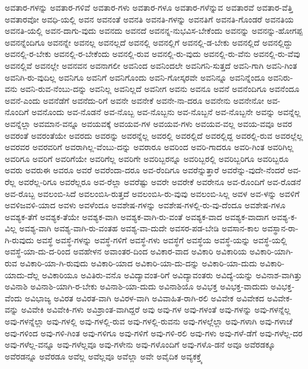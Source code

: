 {ಅವತಾರ-ಗಳನ್ನು
ಅವತಾರ-ಗಳಿವೆ
ಅವತಾರ-ಗಳು
ಅವತಾರ-ಗಳೂ
ಅವತಾರ-ಗಳೆನ್ನುವ
ಅವತಾರವೆ
ಅವತಾರ-ವೆತ್ತಿ
ಅವತಾರವೋ
ಅವಧಿ-ಯಲ್ಲಿ
ಅವನ
ಅವನಂತೆ
ಅವನತಿ
ಅವನತಿ-ಗಳನ್ನು
ಅವನತಿಗೆ
ಅವನತಿ-ಗೊಂಡರೆ
ಅವನತಿಯ
ಅವನತಿ-ಯಲ್ಲಿ
ಅವನ-ದಾಗು-ವುದು
ಅವನದು
ಅವನದೆ
ಅವನನ್ನ-ನುಭವಿಸ-ಬೇಕೆಂದು
ಅವನನ್ನು
ಅವನನ್ನು-ಹೋಗಪ್ಪ
ಅವನನ್ನೆಂದಿಗೂ
ಅವನನ್ನೇ
ಅವನಲ್ಲ
ಅವನಲ್ಲದೆ
ಅವನಲ್ಲಿ
ಅವನಲ್ಲಿಗೆ
ಅವನಲ್ಲಿ-ಡ-ಬೇಕು
ಅವನಲ್ಲಿದೆ
ಅವನಲ್ಲಿದ್ದು
ಅವನಲ್ಲಿ-ರ-ಬೇಕು
ಅವನಲ್ಲಿ-ರ-ಬೇಕೆಂದು
ಅವನಲ್ಲಿ-ರುವ
ಅವನಲ್ಲಿ-ರು-ವುದು
ಅವನಲ್ಲಿ-ರು-ವೆನು
ಅವನಲ್ಲಿ-ರು-ವೆವು
ಅವನಲ್ಲಿವೆ
ಅವನಲ್ಲೇ
ಅವನವನ
ಅವನಾಗಲೀ
ಅವನಿಂದ
ಅವನಿಂದಲೇ
ಅವನಿಗನಿ-ಸುತ್ತದೆ
ಅವನಿ-ಗಾಗಿ
ಅವನಿ-ಗಿಂತ
ಅವನಿಗಿ-ರು-ವುದಿಲ್ಲ
ಅವನಿಗೂ
ಅವನಿಗೆ
ಅವನಿಗೊಂದು
ಅವನಿ-ಗೋಸ್ಕರವೇ
ಅವನಿನ್ನೂ
ಅವನಿನ್ನೆಂದೂ
ಅವನಿರು-ವನು
ಅವನಿ-ರುವ-ನೆಂಬು-ದನ್ನು
ಅವನಿಲ್ಲ
ಅವನಿಲ್ಲದೆ
ಅವನೀಗ
ಅವನು
ಅವನೂ
ಅವನೆ
ಅವನೆಂದಿಗೂ
ಅವನೆಂದೂ
ಅವನೆ-ಎಂದು
ಅವನೆಡೆಗೆ
ಅವನೆದು-ರಿಗೆ
ಅವನೇ
ಅವನೇಕೆ
ಅವನೇ-ನಾ-ದರೂ
ಅವನೇನು
ಅವನೇನೋ
ಅವ-ನೊಂದಿಗೆ
ಅವನೊಂದು
ಅವ-ನೊಡನೆ
ಅವ-ನೊಬ್ಬ
ಅವ-ನೊಬ್ಬನು
ಅವ-ನೊಬ್ಬನೆ
ಅವ-ನೊಬ್ಬನೇ
ಅವನ್ನು
ಅವನ್ನೆಲ್ಲ
ಅವನ್ನೆಲ್ಲಾ
ಅವಮಾನ-ವನ್ನೂ
ಅವಯವಕ್ಕೆ
ಅವಯವ-ಗಳ
ಅವಯವ-ಗಳು
ಅವಯವ-ವಲ್ಲ
ಅವಯ-ವವೂ
ಅವರ
ಅವರಂತೆ
ಅವರಂತೆಯೇ
ಅವರದು
ಅವರನ್ನು
ಅವರನ್ನೆಲ್ಲ
ಅವರಲ್ಲಿ
ಅವರಲ್ಲಿದೆ
ಅವರಲ್ಲಿದ್ದ
ಅವರಲ್ಲಿ-ರುವ
ಅವರಲ್ಲೆಲ್ಲ
ಅವರವರ
ಅವರವರಿಗೆ
ಅವರಾಗಿಲ್ಲ-ವೆಂಬು-ದನ್ನು
ಅವರಾರೂ
ಅವರಿಂದ
ಅವರಿ-ಗಾದರೂ
ಅವರಿ-ಗಿಂತ
ಅವರಿಗಿಲ್ಲ
ಅವರಿಗೂ
ಅವರಿಗೆ
ಅವರಿಗೆಯೇ
ಅವರಿಗೆಲ್ಲ
ಅವರಿಗೇ
ಅವರಿಬ್ಬರನ್ನೂ
ಅವರಿಬ್ಬರಲ್ಲಿ
ಅವರಿಬ್ಬರಿಗೂ
ಅವರಿಬ್ಬರೂ
ಅವರು
ಅವರುಈ
ಅವರೂ
ಅವರೆ
ಅವರೆಂದಾ-ದರೂ
ಅವ-ರೆಂದಿಗೂ
ಅವರೆನ್ನುತ್ತಾರೆ
ಅವರೆನ್ನು-ವುದೇ-ನೆಂದರೆ
ಅವ-ರೆಲ್ಲ
ಅವರೆಲ್ಲ-ರಿಗೂ
ಅವರೆಲ್ಲರೂ
ಅವ-ರೆಲ್ಲಾ
ಅವರೆಷ್ಟು
ಅವರೇ
ಅವರೇಕೆ
ಅವರೇನೂ
ಅವ-ರೊಂದಿಗೆ
ಅವ-ರೊಡನೆ
ಅವ-ರೊಬ್ಬ
ಅವಲಂಬಿ-ಸಿದೆ
ಅವಲಂಬಿಸಿ-ರುತ್ತದೆ
ಅವಲಂಬಿಸಿ-ರು-ವುವು
ಅವಲಂಬಿ-ಸಿಲ್ಲ
ಅವಳ
ಅವ-ಳನ್ನು
ಅವಳಿಗೆ
ಅವಳಿಜವಳಿ-ಯಾದ
ಅವಳು
ಅವಳೆಂದೂ
ಅವಶೇಷ-ಗಳನ್ನು
ಅವಶೇಷ-ಗಳಲ್ಲಿ-ರು-ವು-ದೆಂದೂ
ಅವಶೇಷ-ಗಳೂ
ಅವಶ್ಯಕ-ತೆಗೆ
ಅವಶ್ಯಕ-ತೆಯೇ
ಅವಶ್ಯಕ-ವಾಗಿ
ಅವಶ್ಯಕ-ವಾಗಿ-ರು-ವಂತೆ
ಅವಶ್ಯಕ-ವಾದ
ಅವಶ್ಯಕ-ವಾದಾಗ
ಅವಶ್ಯ-ಕ-ವಿಲ್ಲ
ಅವಶ್ಯ-ವಾಗಿ
ಅವಶ್ಯ-ವಾಗಿ-ರು-ವಂತಹ
ಅವಶ್ಯ-ವಾ-ದುದೇ
ಅವಸರ-ಪಡ-ಬೇಡಿ
ಅವಸಾನ-ಕಾಲ
ಅವಸ್ಥಾನ-ರಾ-ಗಿ-ರುವುದು
ಅವಸ್ಥೆ
ಅವಸ್ಥೆ-ಗಳನ್ನು
ಅವಸ್ಥೆ-ಗಳಿಗೆ
ಅವಸ್ಥೆ-ಗಳು
ಅವಸ್ಥೆಗೆ
ಅವಸ್ಥೆಯ
ಅವಸ್ಥೆ-ಯನ್ನು
ಅವಸ್ಥೆ-ಯಲ್ಲಿ
ಅವಸ್ಥೆ-ಯಾ-ದು-ದ-ರಿಂದ
ಅವಹೇಳನ
ಅವಾಂತರ-ದಿಂದ
ಅವಿಕಾರ-ವಾದ
ಅವಿಕಾರಿ
ಅವಿಕಾರಿಯ
ಅವಿಕಾರಿ-ಯಾಗಿ-ರುವ
ಅವಿಕಾರಿ-ಯಾ-ಗಿ-ರುವುದು
ಅವಿಕಾರಿ-ಯಾದ
ಅವಿಕಾರಿ-ಯಾ-ದು-ದನ್ನು
ಅವಿಕಾರಿ-ಯಾ-ದುದು
ಅವಿಕಾರಿ-ಯಾದು-ದೆಲ್ಲ
ಅವಿಕಾರಿಯೂ
ಅವಿತಿರು-ವನೊ
ಅವಿದ್ಯಾವಂತ-ರಿಗೆ
ಅವಿದ್ಯಾವಂತರು
ಅವಿದ್ಯೆ-ಯನ್ನು
ಅವಿನಾಶ-ವಾಗಿತ್ತು
ಅವಿನಾಶಿ
ಅವಿನಾಶಿ-ಯಾಗಿ-ರ-ಬೇಕು
ಅವಿನಾಶಿ-ಯಾ-ದುದು
ಅವಿನಾಶಿಯೊ
ಅವಿಭಕ್ತ
ಅವಿಭಕ್ತ-ವಾದುದು
ಅವಿಭಕ್ತ-ವೆಂದು
ಅವಿಭಾಜ್ಯ
ಅವಿರತ
ಅವಿರತ-ವಾಗಿ
ಅವಿರಳ-ವಾಗಿ
ಅವಿವಾಹಿತ-ರಾಗಿ-ರಲಿ
ಅವಿವೇಕ
ಅವಿವೇಕದ
ಅವಿವೇಕ-ವನ್ನು
ಅವಿವೇಕಿ
ಅವಿವೇಕಿ-ಗಳು
ಅವಿಶ್ರಾಂತ-ವಾಗಿದ್ದರೆ
ಅವು
ಅವು-ಗಳ
ಅವು-ಗಳಂತೆ
ಅವು-ಗಳನ್ನು
ಅವು-ಗಳನ್ನೆಲ್ಲ
ಅವು-ಗಳನ್ನೆಲ್ಲಾ
ಅವು-ಗಳಲ್ಲಿ
ಅವು-ಗಳಲ್ಲಿ-ರುವ
ಅವು-ಗಳಲ್ಲಿ-ರುವನು
ಅವು-ಗಳಲ್ಲೆಲ್ಲಾ
ಅವು-ಗಳಾಗಿ
ಅವು-ಗಳಾಚೆ
ಅವು-ಗಳಿಂದ
ಅವು-ಗಳಿ-ಗಿಂತ
ಅವು-ಗಳಿಗೂ
ಅವು-ಗಳಿಗೆ
ಅವು-ಗಳಿ-ರಲಿ
ಅವು-ಗಳು
ಅವು-ಗಳೆ-ಡೆಗೆ
ಅವು-ಗಳೆಲ್ಲ-ದರ
ಅವು-ಗಳೆಲ್ಲ-ವನ್ನೂ
ಅವು-ಗಳೆಲ್ಲವೂ
ಅವು-ಗಳೇನು
ಅವು-ಗಳೊಂದಿಗೆ
ಅವು-ಗಳೊ-ಡನೆ
ಅವೂ
ಅವೆರಡಕ್ಕೂ
ಅವೆರಡನ್ನೂ
ಅವೆರಡೂ
ಅವೆಲ್ಲ
ಅವೆಲ್ಲವೂ
ಅವೆಲ್ಲಾ
ಅವೇ
ಅವೈದಿಕ
ಅವ್ಯಕಕ್ತ್ಕೆ
}
